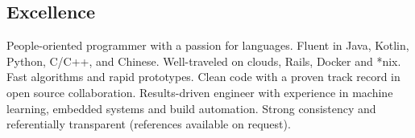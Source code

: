 \documentclass[letterpaper,11pt]{article}
\begin{document}
\begin{justify}
\section{Excellence}
People-oriented programmer with a passion for languages. Fluent in Java, Kotlin, Python, C/C++, and Chinese. Well-traveled on clouds, Rails, Docker and *nix. Fast algorithms and rapid prototypes. Clean code with a proven track record in open source collaboration. Results-driven engineer with experience in machine learning, embedded systems and build automation. Strong consistency and referentially transparent (references available on request).
\end{justify}
\end{document}
